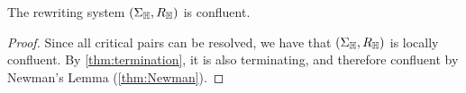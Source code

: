 \begin{thm}
  \label{thm:confluent}
  The rewriting system $(\Sigma_{\mathbb H},R_{\mathbb H})$ is confluent.
\end{thm}

\begin{proof}
  Since all critical pairs can be resolved, we have that $(\Sigma_{\mathbb H},R_{\mathbb H})$ is locally confluent. 
  By \cref{thm:termination}, it is also terminating, and therefore confluent by Newman's Lemma (\cref{thm:Newman}).
\end{proof}



